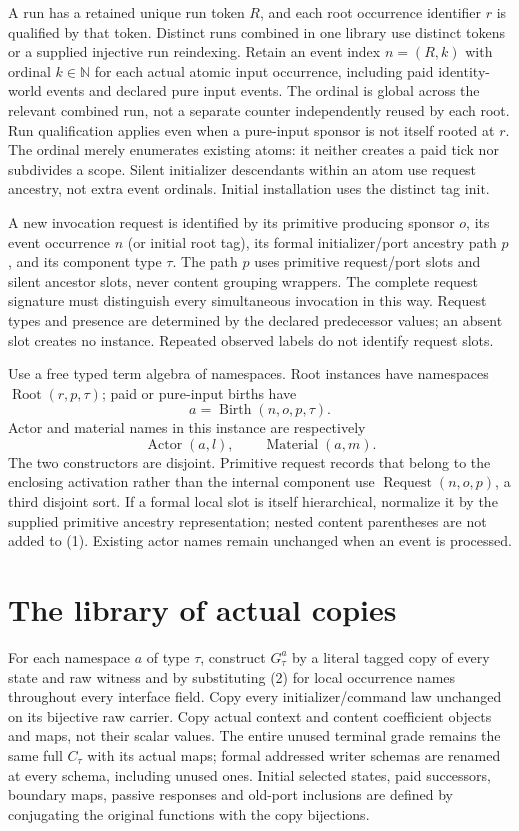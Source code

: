 \documentclass[11pt]{article}
\begin{document}
A run has a retained unique run token $R$, and each root occurrence identifier $r$ is qualified by that token. Distinct runs combined in one library use distinct tokens or a supplied injective run reindexing. Retain an event index $n=(R,k)$ with ordinal $k\in\mathbb N$ for each actual atomic input occurrence, including paid identity-world events and declared pure input events. The ordinal is global across the relevant combined run, not a separate counter independently reused by each root. Run qualification applies even when a pure-input sponsor is not itself rooted at $r$. The ordinal merely enumerates existing atoms: it neither creates a paid tick nor subdivides a scope. Silent initializer descendants within an atom use request ancestry, not extra event ordinals. Initial installation uses the distinct tag $\mathrm{init}$.

A new invocation request is identified by its primitive producing sponsor $o$, its event occurrence $n$ (or initial root tag), its formal initializer/port ancestry path $p$, and its component type $\tau$. The path $p$ uses primitive request/port slots and silent ancestor slots, never content grouping wrappers. The complete request signature must distinguish every simultaneous invocation in this way. Request types and presence are determined by the declared predecessor values; an absent slot creates no instance. Repeated observed labels do not identify request slots.

Use a free typed term algebra of namespaces. Root instances have namespaces $\operatorname{Root}(r,p,\tau)$; paid or pure-input births have
\[
          a=\operatorname{Birth}(n,o,p,\tau).              \tag{1}
\]
Actor and material names in this instance are respectively
\[
       \operatorname{Actor}(a,l),\qquad\operatorname{Material}(a,m).
                                                               \tag{2}
\]
The two constructors are disjoint. Primitive request records that belong to the enclosing activation rather than the internal component use $\operatorname{Request}(n,o,p)$, a third disjoint sort. If a formal local slot is itself hierarchical, normalize it by the supplied primitive ancestry representation; nested content parentheses are not added to (1). Existing actor names remain unchanged when an event is processed.

\section{The library of actual copies}
For each namespace $a$ of type $\tau$, construct $G_\tau^a$ by a literal tagged copy of every state and raw witness and by substituting (2) for local occurrence names throughout every interface field. Copy every initializer/command law unchanged on its bijective raw carrier. Copy actual context and content coefficient objects and maps, not their scalar values. The entire unused terminal grade remains the same full $C_\tau$ with its actual maps; formal addressed writer schemas are renamed at every schema, including unused ones. Initial selected states, paid successors, boundary maps, passive responses and old-port inclusions are defined by conjugating the original functions with the copy bijections.
\end{document}
